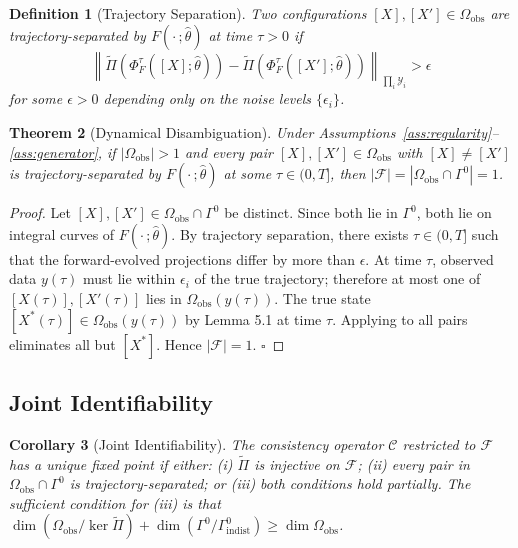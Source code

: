 \documentclass[12pt, oneside]{article}
\newtheorem{theorem}{Theorem}[section]
\newtheorem{corollary}[theorem]{Corollary}
\newtheorem{definition}[theorem]{Definition}
\newcommand{\Ftil}{\widetilde{\Pi}}
\begin{document}
\begin{definition}[Trajectory Separation]
Two configurations $[X],[X'] \in \Omega_{\mathrm{obs}}$ are \emph{trajectory-separated} by
$F(\cdot\,;\hat{\theta})$ at time $\tau > 0$ if
\[
\left\| \Ftil(\Phi^\tau_F([X];\hat{\theta})) - \Ftil(\Phi^\tau_F([X'];\hat{\theta}))
\right\|_{\prod_i \mathcal{Y}_i} > \epsilon
\]
for some $\epsilon > 0$ depending only on the noise levels $\{\epsilon_i\}$.
\end{definition}

\begin{theorem}[Dynamical Disambiguation]
\label{thm:disambiguation}
Under Assumptions~\ref{ass:regularity}--\ref{ass:generator}, if $|\Omega_{\mathrm{obs}}| > 1$
and every pair $[X],[X'] \in \Omega_{\mathrm{obs}}$ with $[X] \ne [X']$ is
trajectory-separated by $F(\cdot\,;\hat{\theta})$ at some $\tau \in (0,T]$, then
$|\mathcal{F}| = |\Omega_{\mathrm{obs}} \cap \Gamma^0| = 1$.
\end{theorem}

\begin{proof}
Let $[X],[X'] \in \Omega_{\mathrm{obs}} \cap \Gamma^0$ be distinct. Since both lie in
$\Gamma^0$, both lie on integral curves of $F(\cdot\,;\hat{\theta})$. By trajectory
separation, there exists $\tau \in (0,T]$ such that the forward-evolved projections differ
by more than $\epsilon$. At time $\tau$, observed data $y(\tau)$ must lie within $\epsilon_i$
of the true trajectory; therefore at most one of $[X(\tau)],[X'(\tau)]$ lies in
$\Omega_{\mathrm{obs}}(y(\tau))$. The true state $[X^*(\tau)] \in \Omega_{\mathrm{obs}}(y(\tau))$
by Lemma 5.1 at time $\tau$. Applying to all pairs eliminates all but $[X^*]$.
Hence $|\mathcal{F}| = 1$. $\square$
\end{proof}

\subsection{Joint Identifiability}

\begin{corollary}[Joint Identifiability]
The consistency operator $\mathcal{C}$ restricted to $\mathcal{F}$ has a unique fixed point
if either: (i) $\Ftil$ is injective on $\mathcal{F}$; (ii) every pair in
$\Omega_{\mathrm{obs}} \cap \Gamma^0$ is trajectory-separated; or (iii) both conditions
hold partially. The sufficient condition for (iii) is that $\dim(\Omega_{\mathrm{obs}}/\ker\Ftil)
+ \dim(\Gamma^0/\Gamma^0_{\mathrm{indist}}) \ge \dim\Omega_{\mathrm{obs}}$.
\end{corollary}
\end{document}
